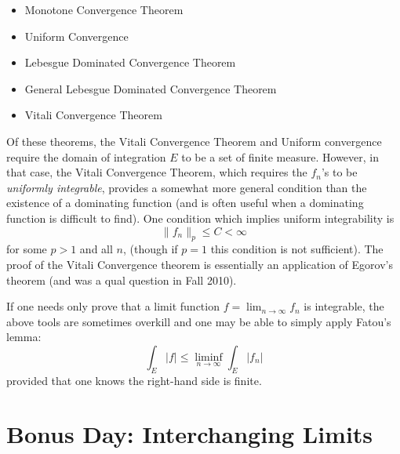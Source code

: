 \documentclass[answers]{exam}
\theoremstyle{problemstyle}
\newcommand{\1}[1]{\textbf{1}_{\left[#1\right]}} %
\begin{document}
\begin{questions}
\begin{itemize}
  \item Monotone Convergence Theorem
  \item Uniform Convergence
  \item Lebesgue Dominated Convergence Theorem
  \item General Lebesgue Dominated Convergence Theorem
  \item Vitali Convergence Theorem
\end{itemize}

Of these theorems, the Vitali Convergence Theorem and Uniform convergence
require the domain of integration $E$ to be a set of finite measure. However, in that case, the Vitali
Convergence Theorem, which requires the $f_{n}$'s to be \textit{uniformly integrable}, provides a somewhat more general condition than the existence of a dominating function (and is often useful when a dominating function is difficult to find).
One condition which implies uniform integrability is 
\begin{equation*}
  \|f_{n}\|_{p}\leq C <\infty
\end{equation*}
for some $p>1$ and all $n$, (though if $p=1$ this condition is not sufficient). The proof of the Vitali Convergence theorem is essentially an application of Egorov's theorem (and was a qual question in Fall 2010).

If one needs only prove that a limit function $f = \lim_{n\to\infty} f_n$ is integrable, the above tools are sometimes overkill and one may be able to simply apply Fatou's lemma:
\begin{equation*}
  \int_{E} |f| \leq  \liminf_{n\to\infty}\int_{E} |f_{n}|
\end{equation*}
provided that one knows the right-hand side is finite.






\newpage
\section{Bonus Day: Interchanging Limits}


\end{questions}
\end{document}
